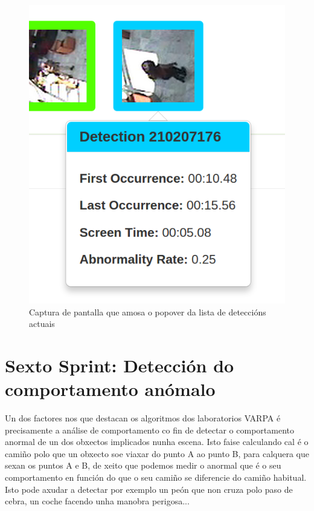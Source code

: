         \begin{figure}[htp]
        \begin{center}
            \includegraphics[scale=0.5]{figures/popoverCapture.png}
            \caption{Captura de pantalla que amosa o popover da lista de deteccións actuais}
        \label{fig:popoverCapture}
        \end{center}
        \end{figure}
        
    
\section{Sexto Sprint: Detección do comportamento anómalo}
    
    Un dos factores nos que destacan os algoritmos dos laboratorios VARPA é precisamente a análise
    de comportamento co fin de detectar o comportamento anormal de un dos obxectos implicados nunha
    escena. Isto faise calculando cal é o camiño polo que un obxecto soe viaxar do punto A ao 
    punto B, para calquera que sexan os puntos A e B, de xeito que podemos medir o anormal que é
    o seu comportamento en función do que o seu camiño se diferencie do camiño habitual. Isto pode
    axudar a detectar por exemplo un peón que non cruza polo paso de cebra, un coche facendo unha 
    manobra perigosa...
    
